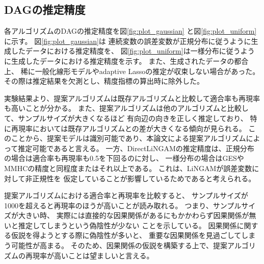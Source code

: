 
\subsection{DAGの推定精度}

各アルゴリズムのDAGの推定精度を図\ref{fig:plot_gaussian}
と図\ref{fig:plot_uniform}に示す。
図\ref{fig:plot_gaussian}は
連続変数の誤差変数が正規分布に従うように生成したデータにおける推定精度を、
図\ref{fig:plot_uniform}は一様分布に従うように生成したデータにおける推定精度を示す。
また、生成されたデータの都合上、
稀に一般化線形モデルやadaptive Lassoの推定が収束しない場合があった。
その際は推定結果を欠測とし、精度指標の算出時に除外した。

実験結果より、提案アルゴリズムは既存アルゴリズムと比較して適合率も再現率も高いことが分かる。
また、提案アルゴリズムは他のアルゴリズムと比較して、サンプルサイズが大きくなるほど
有向辺の向きを正しく推定しており、
特に再現率においては既存アルゴリズムとの差が大きくなる傾向が見られる。
このことから、提案モデルは識別可能であり、本論文による提案アルゴリズムによって推定可能であると言える。
一方、DirectLiNGAMの推定精度は、正規分布の場合は適合率も再現率も0.5を下回るのに対し、
一様分布の場合はGESやMMHCの精度と同程度またはそれ以上である。
これは、LiNGAM\cite{Shimizu2011-pd}が誤差変数に対して非正規性を
仮定していることが影響しているためであると考えられる。

提案アルゴリズムにおける適合率と再現率を比較すると、
サンプルサイズが1000を超えると再現率のほうが高いことが読み取れる。
つまり、サンプルサイズが大きい時、
実際には直接的な因果関係があるにもかかわらず因果関係が無いと推定してしまうという偽陰性が少ない
ことを示している。
因果関係に関する仮説を得ようとする際に偽陰性が多いと、
重要な因果関係を見過ごしてしまう可能性が高まる。
そのため、因果関係の仮説を構築する上で、提案アルゴリズムの再現率が高いことは望ましいと言える。

